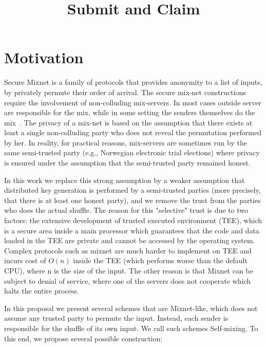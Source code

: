 \documentclass[]{article}
\title{Submit and Claim}
\begin{document}
	\maketitle
	
	
	
	\section{Motivation}
	Secure Mixnet is a family of protocols that provides anonymity to a list of inputs, by privately permute their order of arrival. The secure mix-net constructions require the involvement of non-colluding mix-servers. In most cases outside server are responsible for the mix, while in some setting the senders themselves do the mix~\cite{ryan2016crypto}.
	The privacy of a mix-net is based on the assumption that there exists at least a single non-colluding party who does not reveal the permutation performed by her. In reality, for practical reasons, mix-servers are sometimes run by the same semi-trusted party (e.g., Norwegian electronic trial elections) where privacy is ensured under the assumption that the semi-trusted party remained honest. 
	
	
	
	In this work we replace this strong assumption by a weaker assumption that distributed key generation is performed by a semi-trusted parties (more precisely, that there is at least one honest party), and we remove the trust from the parties who does the actual shuffle. The reason for this "selective" trust is due to two factors:
	the extensive development of trusted executed environment (TEE), which is a secure area inside a main processor which guarantees that the code and data loaded in the TEE are private and cannot be accessed by the operating system. Complex protocols such as mixnet are much harder to implement on TEE and incurs cost of $O(n)$ inside the TEE (which performs worse than the default CPU), where n is the size of the input. The other reason is that Mixnet can be subject to denial of service, where one of the servers does not cooperate which halts the entire process.
	
	
	In this proposal we present several schemes that are Mixnet-like, which does not assume any trusted party to permute the input.  Instead, each sender is responsible for the shuffle of its own input. We call such schemes Self-mixing. To this end, we propose several possible construction:
\end{document}
